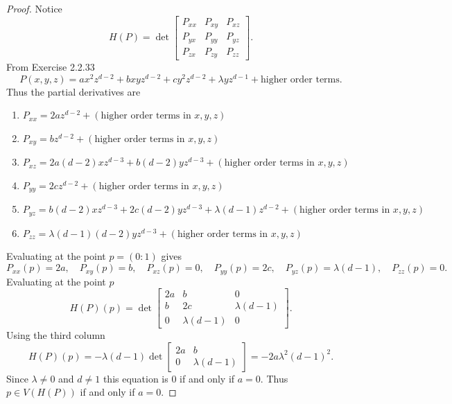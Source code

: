 \begin{proof}
    Notice 
    \[
    H(P) = 
    \det \begin{bmatrix}
        P_{xx} & P_{xy} & P_{xz} \\
        P_{yx} & P_{yy} & P_{yz} \\
        P_{zx} & P_{zy} & P_{zz}
    \end{bmatrix}.
    \]
    From Exercise 2.2.33
    \[
    P(x,y,z)
    =
    ax^2z^{d-2}
    + bxyz^{d-2}
    + cy^2z^{d-2}
    + \lambda yz^{d-1}
    + \text{higher order terms}.
    \]
    Thus the partial derivatives are
    \begin{enumerate}
        \item $P_{xx} = 2az^{d-2} + (\text{higher order terms in } x,y,z)$
        \item $P_{xy} = bz^{d-2} + (\text{higher order terms in } x,y,z)$
        \item $P_{xz} = 2a(d-2)xz^{d-3} + b(d-2)yz^{d-3} + (\text{higher order terms in } x,y,z)$
        \item $P_{yy} = 2cz^{d-2} + (\text{higher order terms in } x,y,z)$
        \item $P_{yz} = b(d-2)xz^{d-3} + 2c(d-2)yz^{d-3} + \lambda(d-1)z^{d-2} + (\text{higher order terms in } x,y,z)$
        \item $P_{zz} = \lambda(d-1)(d-2)yz^{d-3} + (\text{higher order terms in } x,y,z)$
    \end{enumerate}
    Evaluating at the point $p = (0:1)$ gives
    \[
    P_{xx}(p)=2a,\quad
    P_{xy}(p)=b,\quad
    P_{xz}(p)=0,\quad
    P_{yy}(p)=2c,\quad
    P_{yz}(p)=\lambda(d-1),\quad
    P_{zz}(p)=0.
    \]
    Evaluating at the point $p$
    \[
    H(P)(p) =
    \det \begin{bmatrix}
        2a & b & 0 \\
        b & 2c & \lambda (d - 1) \\
        0 & \lambda (d - 1) & 0
    \end{bmatrix}.
    \]
    Using the third column
    \[
    H(P)(p)
    =
    -\lambda (d - 1)
    \det
    \begin{bmatrix}
        2a & b \\
        0 & \lambda (d - 1)
    \end{bmatrix}
    =
    -2a \lambda^2 (d - 1)^2.
    \]
    Since $\lambda \ne 0$ and $d \ne 1$ this equation is $0$ if and only if $a = 0$.
    Thus $p \in V(H(P))$ if and only if $a = 0$.
\end{proof}


